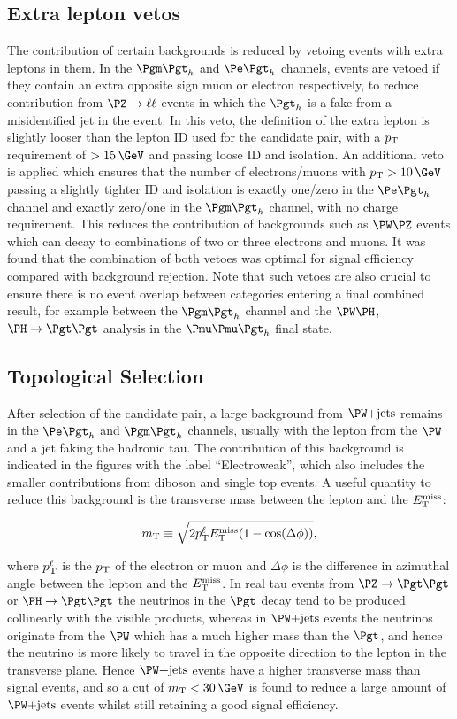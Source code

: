 \subsection{Extra lepton vetos}

The contribution of certain backgrounds is reduced by vetoing events with extra
leptons in them. In the $\mutau$ and $\etau$ channels, events are vetoed if they contain an extra
opposite sign muon or electron respectively, to reduce contribution from 
$\PZ\to\ell\ell$ events in which the $\Pgth$ is a fake from a misidentified 
jet in the event. In this veto, the definition of the extra lepton is slightly 
looser than the lepton ID used for the candidate pair, with a $p_{\mathrm{T}}$ requirement
of $>15\,\GeV$ and passing loose ID and isolation. 
An additional veto is applied which ensures that the number of
electrons/muons with $\pt>10\,\GeV$ passing a slightly tighter ID and isolation
is exactly one/zero in the $\etau$ channel and exactly zero/one in the $\mutau$ channel, with no charge
requirement. This reduces the contribution of backgrounds such as $\PW\PZ$
events which can decay to combinations of two or three electrons and muons. 
It was found that the combination of both vetoes was optimal for signal
efficiency compared with background rejection. Note that such vetoes are also crucial 
to ensure there is no event overlap between categories entering a final combined 
result, for example between the $\mutau$ channel and the 
$\PW\PH$, $\PH\to\Pgt\Pgt$ analysis in the $\Pmu\Pmu\Pgth$ final state. 

\subsection{Topological Selection}
\label{sec:topologicalselection}

After selection of the candidate pair, a large background from $\WJets$ remains
in the $\etau$ and $\mutau$ channels, usually with the lepton from the $\PW$ and
a jet faking the hadronic tau. The contribution of this background is indicated
in the figures with the label ``Electroweak'', which also includes the smaller
contributions from diboson and single top events. A useful quantity to reduce this background is
the transverse mass between the lepton and the $E_{\mathrm{T}}^{\text{miss}}$:

\begin{equation}
m_{\text{T}}\equiv\sqrt{2p_{\mathrm{T}}^{\ell}E_{\mathrm{T}}^{\text{miss}}(1-\cos(\Delta\phi))},
\end{equation}

where $p_{\mathrm{T}}^{\ell}$ is the $p_{\mathrm{T}}$ of the electron or muon and $\Delta\phi$ is the
difference in azimuthal angle between the lepton and the $E_{\mathrm{T}}^{\text{miss}}$. In real tau
events from $\PZ\to\Pgt\Pgt$ or $\PH\to\Pgt\Pgt$ the neutrinos in the $\Pgt$
decay tend to be produced collinearly with the visible products, whereas in
$\WJets$ events the neutrinos originate from the $\PW$ which has a much higher
mass than the $\Pgt$, and hence the neutrino is more likely to travel in the
opposite direction to the lepton in the transverse plane. Hence $\WJets$ events
have a higher transverse mass than signal events, and so a cut of
$m_{\text{T}}<30\,\GeV$ is found to reduce a large amount of $\WJets$ events
whilst still retaining a good signal efficiency. 


